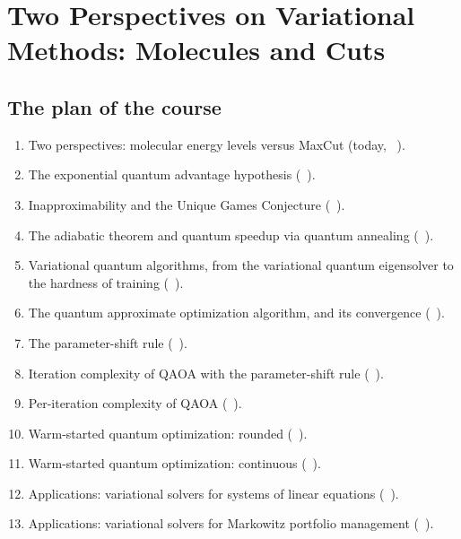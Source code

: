 \documentclass[handoutsbeamer.tex]{subfiles}
\begin{document}
\thispagestyle{empty}

\ona{ \setcounter{chapter}{0} } %
\chapter{Two Perspectives on Variational Methods: Molecules and Cuts}\label{C.Motivation}

\section{The plan of the course}

\begin{frame}
\onp{\footnotesize}
\begin{enumerate}\setlength\itemsep{0.05em}
    \item Two perspectives: molecular energy levels versus MaxCut (today, \Chap~).
    \item The exponential quantum advantage hypothesis (\Chap~).
    \item Inapproximability and the Unique Games Conjecture (\Chap~).
    \item The adiabatic theorem and quantum speedup via quantum annealing (\Chap~).
    \item Variational quantum algorithms, from the variational quantum eigensolver to the hardness of training (\Chap~).
    \item The quantum approximate optimization algorithm, and its convergence (\Chap~).
    \item The parameter-shift rule (\Chap~).
    \item Iteration complexity of QAOA with the parameter-shift rule (\Chap~).
    \item Per-iteration complexity of QAOA (\Chap~).
    \item Warm-started quantum optimization: rounded (\Chap~).
    \item Warm-started quantum optimization: continuous (\Chap~).
    \item Applications: variational solvers for systems of linear equations (\Chap~).
    \item Applications: variational solvers for Markowitz portfolio management (\Chap~).
\end{enumerate}
\end{frame}
\end{document}
